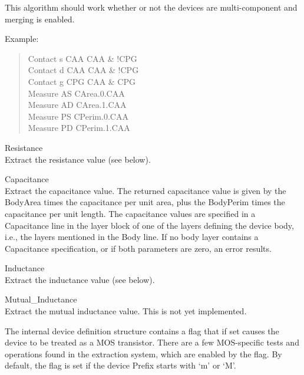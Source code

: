 \begin{description}
\begin{description}
This algorithm should work whether or not the devices are
multi-component and merging is enabled.

Example:

\begin{quote}\rr\vt
Contact s CAA CAA \& !CPG\\
Contact d CAA CAA \& !CPG\\
Contact g CPG CAA \& CPG\\
Measure AS CArea.0.CAA\\
Measure AD CArea.1.CAA\\
Measure PS CPerim.0.CAA\\
Measure PD CPerim.1.CAA\\
\end{quote}

\begin{description}
\item{\et Resistance}\\
Extract the resistance value (see below).

\item{\et Capacitance}\\
Extract the capacitance value.  The returned capacitance value is
given by the BodyArea times the capacitance per unit area, plus the
BodyPerim times the capacitance per unit length.  The capacitance
values are specified in a {\et Capacitance} line in the layer block of
one of the layers defining the device body, i.e., the layers mentioned
in the {\et Body} line.  If no body layer contains a {\et
Capacitance} specification, or if both parameters are zero, an error
results.

\item{\et Inductance}\\
Extract the inductance value (see below).

\item{\et Mutual\_Inductance}\\
Extract the mutual inductance value.  This is not yet implemented.
\end{description}
\end{description}

\end{description}
The internal device definition structure contains a flag that if set
causes the device to be treated as a MOS transistor.  There are a few
MOS-specific tests and operations found in the extraction system,
which are enabled by the flag.  By default, the flag is set if the
device {\vt Prefix} starts with `m' or `M'.

